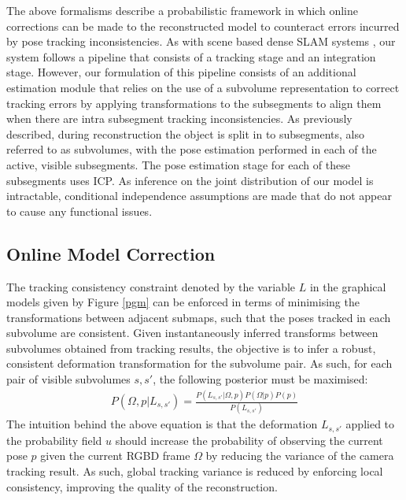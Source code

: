 The above formalisms describe a probabilistic framework in which online corrections can be made to the reconstructed model to counteract 
errors incurred by pose tracking inconsistencies. As with scene based dense SLAM systems \cite{Newcombe2011, Prisacariu2014, Niessner2013}, 
our system follows a pipeline that consists of a tracking stage and an integration stage. However, our formulation of this pipeline 
consists of an additional estimation module that relies on the use of a subvolume representation to correct tracking errors by applying 
transformations to the subsegments to align them when there are intra subsegment tracking inconsistencies. 
As previously described, during reconstruction the object is split in to subsegments, also referred to as subvolumes, 
with the pose estimation performed in each of the active, visible subsegments. The pose estimation stage for each of these subsegments uses ICP.
As inference on the joint distribution of our model is intractable, conditional independence assumptions are made that do not appear 
to cause any functional issues.

\subsection{Online Model Correction}
\label{subsec:onlinemodelcorrection}

The tracking consistency constraint denoted by the variable $L$ in the graphical models given by Figure \ref{pgm} can 
be enforced in terms of minimising the transformations between adjacent submaps, such that the poses tracked in each subvolume are consistent.  
Given instantaneously inferred transforms between subvolumes obtained from tracking results, 
the objective is to infer a robust, consistent deformation transformation for the subvolume pair.
As such, for each pair of visible subvolumes $s, s'$, the following posterior must be maximised:
\begin{equation}
\begin{split}
P(\Omega, p | L_{s, s'}) = \frac{P(L_{s, s'} | \Omega, p) P(\Omega | p)P(p)}
{P(L_{s, s'})}
\end{split}
\end{equation}
The intuition behind the above equation is that the deformation $L_{s, s'}$ applied to the probability field $u$ should 
increase the probability of observing the current pose $p$ given the current RGBD frame $\Omega$ by reducing the 
variance of the camera tracking result. As such, global tracking variance is reduced by enforcing local consistency, improving the quality 
of the reconstruction.

